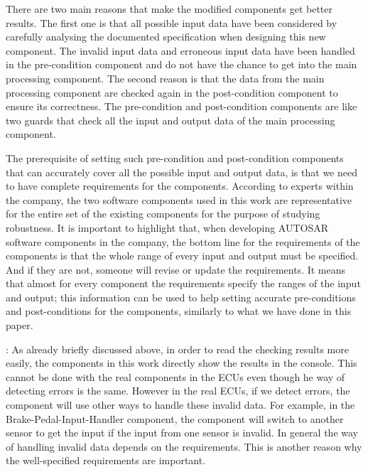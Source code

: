 There are two main reasons that make the modified components get better results. The first one is that all possible input data have been considered by carefully analysing the documented specification when designing this new component. The invalid input data and erroneous input data have been handled in the pre-condition component and do not have the chance to get into the main processing component. The second reason is that the data from the main processing component are checked again in the post-condition component to ensure its correctness. The pre-condition and post-condition components are like two guards that check all the input and output data of the main processing component. 

The prerequisite of setting such pre-condition and post-condition components that can accurately cover all the possible input and output data, is that we need to have complete requirements for the components. 
According to experts within the company, %
the two software components used in this work are representative for the entire set of the existing components for the purpose of studying robustness. It is important to highlight that, when developing AUTOSAR software components in the company, the bottom line for the requirements of the components is that the whole range of every input and output must be specified. And if they are not, someone will revise or update the requirements. It means that almost for every component the requirements specify the ranges of the input and output; this information can be used to help setting accurate pre-conditions and post-conditions for the components, similarly to what we have done in this paper.


: 
As already briefly discussed above, in order to read the checking results more easily, the components in this work directly show the results in the console. %
This cannot be done with the real components in the ECUs even though he way of detecting errors is the same. However in the real ECUs, if we detect errors, the component will use other ways to handle these invalid data. For example, in the Brake-Pedal-Input-Handler component, the component will switch to another sensor to get the input if the input from one sensor is invalid. In general the way of handling %
invalid data depends on the requirements. This is another reason why the well-specified requirements are important. 

